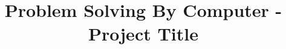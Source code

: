 \documentclass[11pt]{article}
\begin{document}
\title{Problem Solving By Computer - Project Title}
\date{}
\maketitle

\newpage
\setcounter{section}{3}

\end{document}
